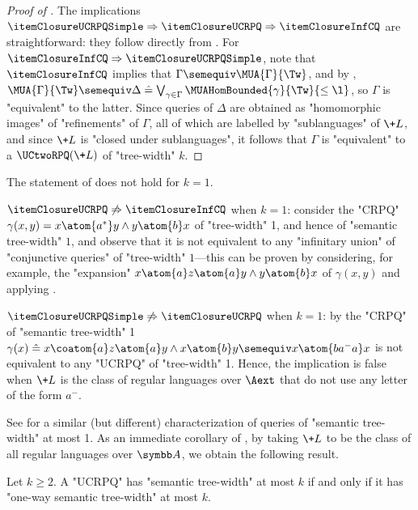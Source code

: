 \begin{proof}[Proof of ]
    The implications
	$\itemClosureUCRPQSimple \Rightarrow \itemClosureUCRPQ \Rightarrow \itemClosureInfCQ$
	are straightforward:
    they follow directly from .
    For $\itemClosureInfCQ \Rightarrow \itemClosureUCRPQSimple$, note that $\itemClosureInfCQ$ implies that
    $\Gamma \semequiv \MUA{\Gamma}{\Tw}$, and by
    ,
    $\MUA{\Gamma}{\Tw} \semequiv \Delta \defeq
    \bigvee_{\gamma \in \Gamma} \MUAHomBounded{\gamma}{\Tw}{\leq \l}$,
    so $\Gamma$ is "equivalent" to the latter.
    Since queries of $\Delta$ are obtained as "homomorphic images"
    of "refinements" of $\Gamma$, all of which are labelled by "sublanguages" of
    $\+L$, and since $\+L$ is "closed under sublanguages", it follows that
    $\Gamma$ is "equivalent" to a $\UCtwoRPQ(\+L)$ of "tree-width" $k$.
\end{proof}

\begin{remark}
    \AP\label{rk:closure-under-sublanguages-k1}
	The statement of  does not hold for $k=1$.

    $\itemClosureUCRPQ \not\Rightarrow \itemClosureInfCQ$ when $k=1$:
    consider the "CRPQ" $\gamma(x,y) = x \atom{a^*} y \land y \atom{b} x$ of "tree-width" 1,
    and hence of "semantic tree-width" $1$, and observe that it is not equivalent to any
    "infinitary union" of "conjunctive queries" of "tree-width" $1$---this can be proven
    by considering, for example, the "expansion"
    $x \atom{a} z \atom{a} y \land y \atom{b} x$ of $\gamma(x,y)$
    and applying .

    $\itemClosureUCRPQSimple \not\Rightarrow \itemClosureUCRPQ$ when $k=1$:
	by \cite[Proposition 6.4]{BarceloRomeroVardi2016SemanticAcyclicity} the "CRPQ"
    of "semantic tree-width" 1
    $\gamma(x) \defeq x \coatom{a} z \atom{a} y \land x \atom{b} y \semequiv x \atom{ba^- a} x$
    is not equivalent to any "UCRPQ" of "tree-width" 1. Hence, the implication is false when $\+L$ is the class of regular languages over $\Aext$
    that do not use any letter of the form $a^-$.
\end{remark}

See  for a similar (but different) characterization
of queries of "semantic tree-width" at most 1.
As an immediate corollary of , by taking
$\+L$ to be the class of all regular languages over $\A$, we obtain the following result.
\begin{corollary}
	\AP\label{coro:collapse-twoway-oneway-semtw}
	Let $k \geq 2$. A "UCRPQ" has "semantic tree-width" at most $k$
	if and only if it has "one-way semantic tree-width" at most $k$.
\end{corollary}

